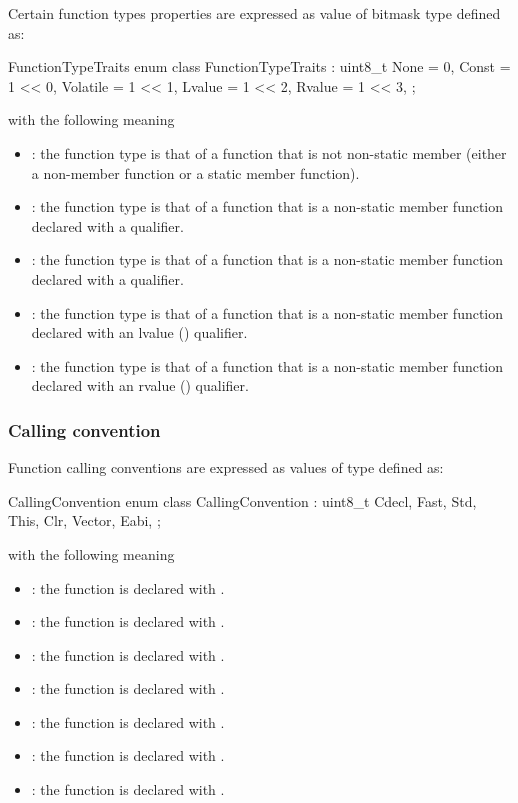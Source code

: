 Certain function types properties are expressed as value of bitmask type  defined as:
%
\begin{typedef}{FunctionTypeTraits}{}
	enum class FunctionTypeTraits : uint8_t {
		None			= 0,
		Const			= 1 << 0,
		Volatile			= 1 << 1,
		Lvalue			= 1 << 2,
		Rvalue			= 1 << 3,
	};
\end{typedef}
%
with the following meaning
\begin{itemize}
	\item {}: the function type is that of a function that is not non-static member (either a non-member function
		or a static member function).
	\item {}: the function type is that of a function that is a non-static member function declared with a 
		qualifier.
	\item {}: the function type is that of a function that is a non-static member function declared with a 
		qualifier.
	\item {}: the function type is that of a function that is a non-static member function declared with an lvalue (\code{\&})
		qualifier.
	\item {}: the function type is that of a function that is a non-static member function declared with an rvalue (\code{\&\&})
		qualifier.
\end{itemize}


\subsubsection{Calling convention}
\label{sec:ifc-calling-convention}

Function calling conventions are expressed as values of type  defined as:
%
\begin{typedef}{CallingConvention}{}
	enum class CallingConvention : uint8_t {
		Cdecl,
		Fast,
		Std,
		This,
		Clr,
		Vector,
		Eabi,
	};
\end{typedef}
%
with the following meaning
\begin{itemize}
	\item {}: the function is declared with .
	\item {}: the function is declared with .
	\item {}: the function is declared with .
	\item {}: the function is declared with .
	\item {}: the function is declared with .
	\item {}: the function is declared with .
	\item {}: the function is declared with .
\end{itemize}


